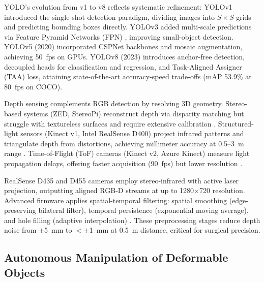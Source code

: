 \documentclass[journal]{IEEEtran}
\begin{document}
YOLO's evolution from v1 to v8 reflects systematic refinement: YOLOv1 \cite{redmon2016you} introduced the single-shot detection paradigm, dividing images into $S \times S$ grids and predicting bounding boxes directly. YOLOv3 \cite{redmon2018yolov3} added multi-scale predictions via Feature Pyramid Networks (FPN) \cite{lin2017feature}, improving small-object detection. YOLOv5 (2020) incorporated CSPNet backbones and mosaic augmentation, achieving 50~fps on GPUs. YOLOv8 \cite{ultralytics2023yolov8} (2023) introduces anchor-free detection, decoupled heads for classification and regression, and Task-Aligned Assigner (TAA) loss, attaining state-of-the-art accuracy-speed trade-offs (mAP 53.9\% at 80~fps on COCO).

Depth sensing complements RGB detection by resolving 3D geometry. Stereo-based systems (ZED, StereoPi) reconstruct depth via disparity matching but struggle with textureless surfaces and require extensive calibration \cite{hirschmuller2007stereo}. Structured-light sensors (Kinect v1, Intel RealSense D400) project infrared patterns and triangulate depth from distortions, achieving millimeter accuracy at 0.5--3~m range \cite{intel2023realsense}. Time-of-Flight (ToF) cameras (Kinect v2, Azure Kinect) measure light propagation delays, offering faster acquisition (90~fps) but lower resolution \cite{grzegorzek2013time}.

RealSense D435 and D455 cameras employ stereo-infrared with active laser projection, outputting aligned RGB-D streams at up to 1280$\times$720 resolution. Advanced firmware applies spatial-temporal filtering: spatial smoothing (edge-preserving bilateral filter), temporal persistence (exponential moving average), and hole filling (adaptive interpolation) \cite{intel2023realsense}. These preprocessing stages reduce depth noise from $\pm$5~mm to $<$$\pm$1~mm at 0.5~m distance, critical for surgical precision.

\subsection{Autonomous Manipulation of Deformable Objects}
\end{document}
